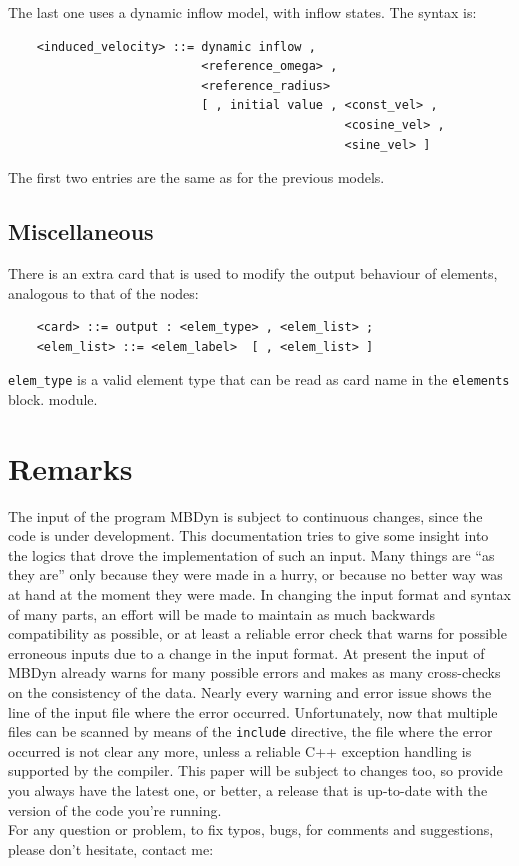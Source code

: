 \noindent
The last one uses a dynamic inflow model, with inflow states.
The syntax is:
\begin{verbatim}
    <induced_velocity> ::= dynamic inflow , 
                           <reference_omega> , 
                           <reference_radius> 
                           [ , initial value , <const_vel> ,
                                               <cosine_vel> ,
                                               <sine_vel> ]
\end{verbatim}
The first two entries are the same as for the previous models. 




\section{Miscellaneous}
There is an extra card that is used to modify the output behaviour of 
elements, analogous to that of the nodes:
\begin{verbatim}
    <card> ::= output : <elem_type> , <elem_list> ;
    <elem_list> ::= <elem_label>  [ , <elem_list> ]
\end{verbatim}
\texttt{elem\_type} is a valid element type that can be read 
as card name in the \texttt{elements} block.
module.





\chapter{Remarks}
The input of the program MBDyn is subject to continuous changes, since the
code is under development.
This documentation tries to give some insight into the logics that drove
the implementation of such an input.
Many things are ``as they are'' only because they were made in a hurry, 
or because no better way was at hand at the moment they were made.
In changing the input format and syntax of many parts, an effort 
will be made to maintain as much backwards compatibility as possible,
or at least a reliable error check that warns for possible erroneous 
inputs due to a change in the input format. 
At present the input of MBDyn already warns for many possible errors 
and makes as many cross-checks on the consistency of the data. 
Nearly every warning and error issue shows the line of the input file 
where the error occurred. 
Unfortunately, now that multiple files can be scanned by means of the 
\texttt{include} directive, the file where the error occurred is not clear 
any more, unless a reliable C++ exception handling is supported by the
compiler.
This paper will be subject to changes too, so provide you always have the
latest one, or better, a release that is up-to-date with the version of the
code you're running. \\
For any question or problem, to fix typos, bugs, for comments and
suggestions, please don't hesitate, contact me:\vspace{10mm}\\


